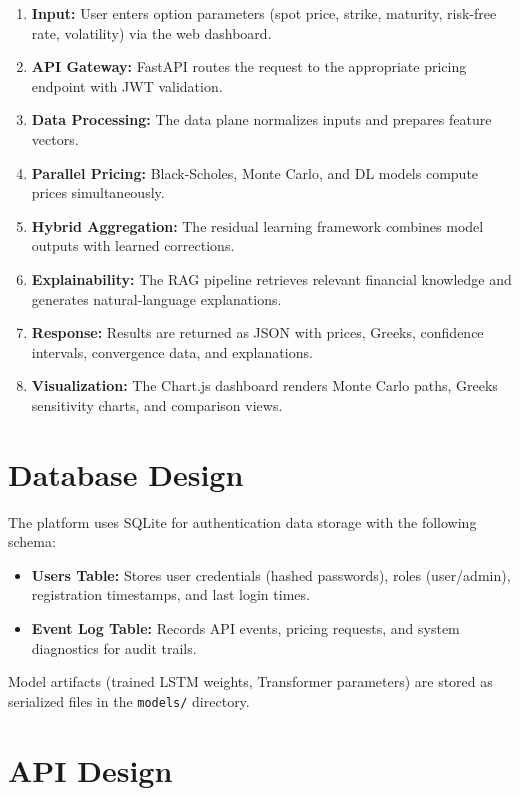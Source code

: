 \documentclass[12pt,a4paper]{report}
\begin{document}
\begin{enumerate}
    \item \textbf{Input:} User enters option parameters (spot price, strike, maturity, risk-free rate, volatility) via the web dashboard.
    \item \textbf{API Gateway:} FastAPI routes the request to the appropriate pricing endpoint with JWT validation.
    \item \textbf{Data Processing:} The data plane normalizes inputs and prepares feature vectors.
    \item \textbf{Parallel Pricing:} Black-Scholes, Monte Carlo, and DL models compute prices simultaneously.
    \item \textbf{Hybrid Aggregation:} The residual learning framework combines model outputs with learned corrections.
    \item \textbf{Explainability:} The RAG pipeline retrieves relevant financial knowledge and generates natural-language explanations.
    \item \textbf{Response:} Results are returned as JSON with prices, Greeks, confidence intervals, convergence data, and explanations.
    \item \textbf{Visualization:} The Chart.js dashboard renders Monte Carlo paths, Greeks sensitivity charts, and comparison views.
\end{enumerate}

\section{Database Design}

The platform uses SQLite for authentication data storage with the following schema:

\begin{itemize}
    \item \textbf{Users Table:} Stores user credentials (hashed passwords), roles (user/admin), registration timestamps, and last login times.
    \item \textbf{Event Log Table:} Records API events, pricing requests, and system diagnostics for audit trails.
\end{itemize}

Model artifacts (trained LSTM weights, Transformer parameters) are stored as serialized files in the \texttt{models/} directory.

\section{API Design}
\end{document}
